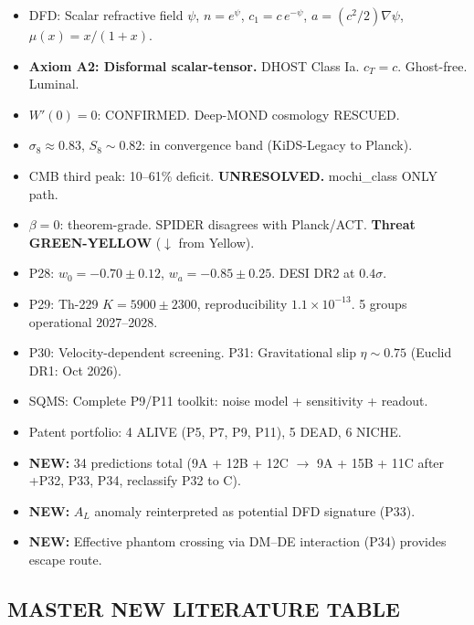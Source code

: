 \documentclass[11pt,a4paper]{article}
\begin{document}
\begin{itemize}
\item DFD: Scalar refractive field $\psi$, $n = e^\psi$, $c_1 = c\,e^{-\psi}$, $a = (c^2/2)\nabla\psi$, $\mu(x) = x/(1+x)$.
\item \textbf{Axiom A2: Disformal scalar-tensor.} DHOST Class Ia. $c_T = c$. Ghost-free. Luminal.
\item $W'(0) = 0$: CONFIRMED. Deep-MOND cosmology RESCUED.
\item $\sigma_8 \approx 0.83$, $S_8 \sim 0.82$: in convergence band (KiDS-Legacy to Planck).
\item CMB third peak: 10--61\% deficit. \textbf{UNRESOLVED.} mochi\_class ONLY path.
\item $\beta = 0$: theorem-grade. SPIDER disagrees with Planck/ACT. \textbf{Threat GREEN-YELLOW} ($\downarrow$ from Yellow).
\item P28: $w_0 = -0.70 \pm 0.12$, $w_a = -0.85 \pm 0.25$. DESI DR2 at $0.4\sigma$.
\item P29: Th-229 $K=5900\pm2300$, reproducibility $1.1\times10^{-13}$. 5 groups operational 2027--2028.
\item P30: Velocity-dependent screening. P31: Gravitational slip $\eta \sim 0.75$ (Euclid DR1: Oct 2026).
\item SQMS: Complete P9/P11 toolkit: noise model + sensitivity + readout.
\item Patent portfolio: 4 ALIVE (P5, P7, P9, P11), 5 DEAD, 6 NICHE.
\item \textbf{NEW:} 34 predictions total (9A + 12B + 12C $\to$ 9A + 15B + 11C after +P32, P33, P34, reclassify P32 to C).
\item \textbf{NEW:} $A_L$ anomaly reinterpreted as potential DFD signature (P33).
\item \textbf{NEW:} Effective phantom crossing via DM--DE interaction (P34) provides escape route.
\end{itemize}

\subsection{MASTER NEW LITERATURE TABLE}
\end{document}
